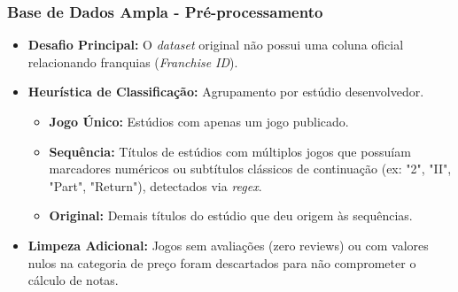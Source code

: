 \begin{frame}
\frametitle{Base de Dados Ampla - Pré-processamento}
\justifying

\begin{itemize}
    \item \textbf{Desafio Principal:} O \textit{dataset} original não possui uma coluna oficial relacionando franquias (\textit{Franchise ID}).
    \vspace{0.2cm}

    \item \textbf{Heurística de Classificação:} Agrupamento por estúdio desenvolvedor.
    \begin{itemize}
        \item \textbf{Jogo Único:} Estúdios com apenas um jogo publicado.
        \item \textbf{Sequência:} Títulos de estúdios com múltiplos jogos que possuíam marcadores numéricos ou subtítulos clássicos de continuação (ex: "2", "II", "Part", "Return"), detectados via \textit{regex}.
        \item \textbf{Original:} Demais títulos do estúdio que deu origem às sequências.
    \end{itemize}
    \vspace{0.2cm}

    \item \textbf{Limpeza Adicional:} Jogos sem avaliações (zero reviews) ou com valores nulos na categoria de preço foram descartados para não comprometer o cálculo de notas.
\end{itemize}    
\end{frame}